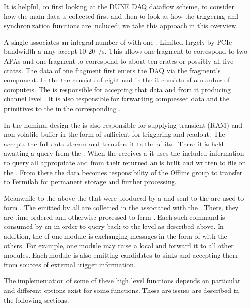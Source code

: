 It is helpful, on first looking at the DUNE DAQ dataflow scheme, to
consider how the main data is collected first and then to look at how
the triggering and synchronization functions are included; we take
this approach in this overview. 

A single  associates an integral number of
 with one . 
Limited largely by PCIe bandwidth a  may accept
10-20~\si{\GB/\s}. 
This allows one  fragment to correspond to two APAs and one
 fragment to correspond to about ten  crates or
possibly all five  crates.
The data of one fragment first enters the DAQ via the fragment's
 component.
In the  the  consists of eight  and
in the  it consists of a number of computers.  
The  is responsible for accepting that data and from it
producing channel level .
It is also responsible for forwarding compressed data and the
primitives to the  in the corresponding .

In the nominal design the  is also responsible for
supplying transient (RAM) and non-volatile buffer in the form of
 sufficient for  triggering and readout.
The  accepts the full data stream and transfers it to the
 of its . 
There it is held awaiting a query from the . 
When the  receives a  it uses the
included information to query all appropriate  and from
their returned  an  is built and
written to file on the . 
From there the data becomes responsibility of the Offline group to
transfer to Fermilab for permanent storage and further processing.

Meanwhile to the above the  that were produced
by a  and sent to the  are used to form
. 
The  emitted by all  are
collected in the  associated with the . 
There, they are time ordered and otherwise processed to form
. 
Each such command is consumed by an  in order to query back
to the  level as described above.
In addition, the  of one module is exchanging messages
in the form of  with the others. 
For example, one module may raise a local 
 and forward it to all other modules.
Each module is also emitting candidates to sinks and accepting them
from sources of external trigger information.

The implementation of some of these high level functions depends on
particular  and different options exist for some
functions.  These are issues are described in the following sections.

